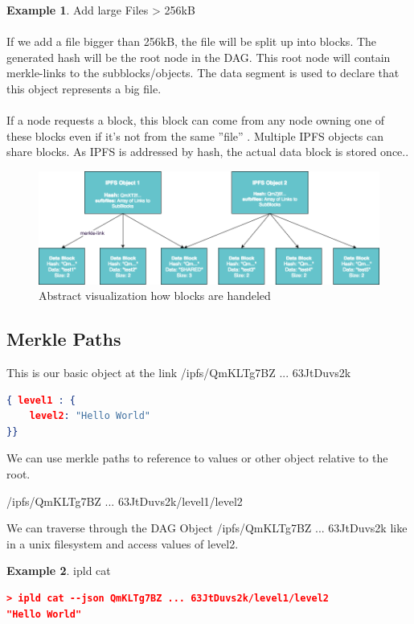 \documentclass[a4paper,11pt, oneside]{report}
\theoremstyle{definition}
\newtheorem{exmp}{Example}[subsection]
\begin{document}
\begin{exmp}{Add large Files > 256kB}\\ \\
If we add a file bigger than 256kB, the file will be split up into blocks. The generated hash will be the root node in the DAG. This root node will contain merkle-links to the subblocks/objects. The data segment is used to declare that this object represents a big file.\\ \\
If a node requests a block, this block can come from any node owning one of these blocks even if it's not from the same ''file'' \cite{fileblock}. Multiple IPFS objects can share blocks. As IPFS is addressed by hash, the actual data block is stored once.\cite{fileblock2}. \\[0.3cm]
\begin{figure}[H]
\centering
\includegraphics[width=\textwidth]{img/ipfs-fileblocks-big.png}
\caption[Big Object \& Blocks]{Abstract visualization how blocks are handeled}
\end{figure}
\end{exmp}

\newpage
\subsection{Merkle Paths}
This is our basic object at the link /ipfs/QmKLTg7BZ ... 63JtDuvs2k\\
\begin{lstlisting}[language=json]
{ level1 : {
	level2: "Hello World"
}}
\end{lstlisting}
We can use merkle paths to reference to values or other object relative to the root.
\begin{center}
/ipfs/QmKLTg7BZ ... 63JtDuvs2k/level1/level2
\end{center}
We can traverse through the DAG Object /ipfs/QmKLTg7BZ ... 63JtDuvs2k like in a unix filesystem and access values of level2.
\begin{exmp} ipld cat
\begin{lstlisting}[language=json]
> ipld cat --json QmKLTg7BZ ... 63JtDuvs2k/level1/level2
"Hello World"
\end{lstlisting}
\end{exmp}
\end{document}
